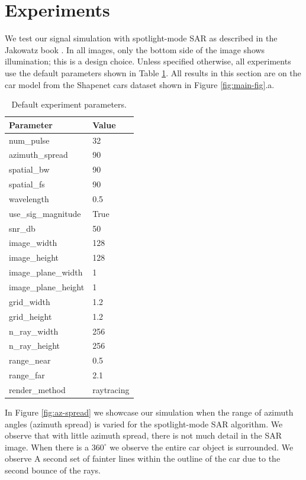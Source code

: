 \documentclass[onecolumn]{IEEEtran}
\begin{document}
\section{Experiments}
\label{sec:experiments}
We test our signal simulation with spotlight-mode SAR as described in the Jakowatz book \cite{spotlightmodesar}. In all images, only the bottom side of the image shows illumination; this is a design choice. Unless specified otherwise, all experiments use the default parameters shown in Table \ref{tab:params}. All results in this section are on the car model from the Shapenet \cite{shapenet} cars dataset shown in Figure \ref{fig:main-fig}.a.
\begin{table}[h!]
\centering
\caption{Default experiment parameters.}
\label{tab:params}
\begin{tabular}{ll}
\toprule
\textbf{Parameter} & \textbf{Value} \\
\midrule
num\_pulse & 32 \\
azimuth\_spread & 90 \\
spatial\_bw & 90 \\
spatial\_fs & 90 \\
wavelength & 0.5 \\
use\_sig\_magnitude & True \\
snr\_db & 50 \\
image\_width & 128 \\
image\_height & 128 \\
image\_plane\_width & 1 \\
image\_plane\_height & 1 \\
grid\_width & 1.2 \\
grid\_height & 1.2 \\
n\_ray\_width & 256 \\
n\_ray\_height & 256 \\
range\_near & 0.5 \\
range\_far & 2.1 \\
render\_method & raytracing \\
\bottomrule
\end{tabular}
\end{table}

In Figure \ref{fig:az-spread} we showcase our simulation when the range of azimuth angles (azimuth spread) is varied for the spotlight-mode SAR algorithm. We observe that with little azimuth spread, there is not much detail in the SAR image. When there is a $360^\circ$ we observe the entire car object is surrounded. We observe A second set of fainter lines within the outline of the car due to the second bounce of the rays.
        
\end{document}
